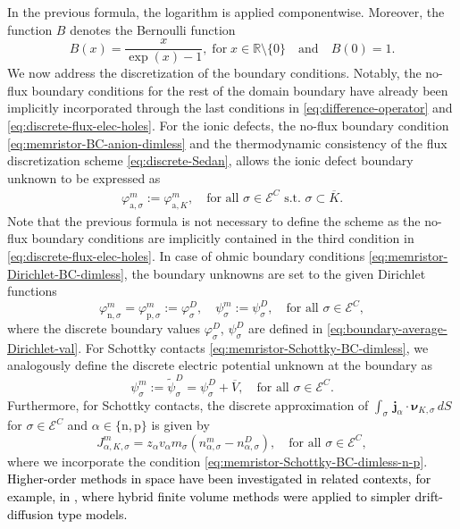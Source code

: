 \documentclass[10pt,a4paper, final]{article}
\newcommand{\reviewerTwo}[1]{\textcolor{black}{#1}}
\def\electrons{\text{n}}
\def\holes{\text{p}}
\def\ions{\text{a}}
\theoremstyle{definition}								%
\numberwithin{equation}{section}
\numberwithin{figure}{section}
\numberwithin{theorem}{section}
\begin{document}
In the previous formula, the logarithm is applied componentwise.
Moreover, the function $B$ denotes the Bernoulli function
\begin{equation} \label{eq:bernoulli}
    B(x) = \frac{x}{\exp(x) -1},\; \text{for}\; x \in \mathbb{R} \setminus \{0\} \quad \text{and} \quad B(0)=1.
\end{equation}
We now address the discretization of the boundary conditions.
Notably, the no-flux boundary conditions for the rest of the domain boundary have already been implicitly incorporated through the last conditions in \eqref{eq:difference-operator} and \eqref{eq:discrete-flux-elec-holes}.
For the ionic defects, the no-flux boundary condition \eqref{eq:memristor-BC-anion-dimless} and the thermodynamic consistency of the flux discretization scheme \eqref{eq:discrete-Sedan}, allows the ionic defect boundary unknown to be expressed as
\begin{align} \label{eq:boundary-unknown-ion}
\varphi_{\ions, \sigma}^{m} := \varphi_{\ions, K}^{m}, \quad \text{for all } \sigma \in \mathcal{E}^C {\text{ s.t. }\sigma\subset \overline{K}}.
\end{align}
Note that the previous formula is not necessary to define the scheme as the no-flux boundary conditions are implicitly contained in the third condition in \eqref{eq:discrete-flux-elec-holes}.
In case of ohmic boundary conditions \eqref{eq:memristor-Dirichlet-BC-dimless}, the boundary unknowns are set to the given Dirichlet functions
\begin{equation} \label{eq:boundary-ohmic}
       \varphi_{\electrons, \sigma}^{m} = \varphi_{\holes, \sigma}^{m}  := \varphi_{\sigma}^{D}, \quad \psi_\sigma^{m} := \psi_\sigma^D, \quad \text{for all } \sigma \in \mathcal{E}^C,
\end{equation}
where the discrete boundary values $\varphi_{\sigma}^{D}$, $\psi_\sigma^D$ are defined in \eqref{eq:boundary-average-Dirichlet-val}.
For Schottky contacts \eqref{eq:memristor-Schottky-BC-dimless}, we analogously define the discrete electric potential unknown at the boundary as
\begin{equation} \label{eq:Schottky-psi-sigma}
\psi_\sigma^{m} := \tilde{\psi}_\sigma^D = \psi_\sigma^D + \overline{V} , \quad \text{for all } \sigma \in \mathcal{E}^C.
\end{equation}
Furthermore, for Schottky contacts, the discrete approximation of $ \int_\sigma \, \mathbf{j}_\alpha \cdot \boldsymbol{\nu}_{K, \sigma} \,d S$ for $\sigma \in \mathcal{E}^C$ and $\alpha \in \{ \electrons, \holes \}$ is given by
\begin{equation} \label{eq:discrete-flux-boundary}
J_{\alpha,K, \sigma}^m =  z_\alpha v_\alpha m_\sigma (n_{\alpha, \sigma}^m - n_{\alpha, \sigma}^D), \quad \text{for all } \sigma \in \mathcal{E}^C,
\end{equation}
where we incorporate the condition \eqref{eq:memristor-Schottky-BC-dimless-n-p}.
\reviewerTwo{
    Higher-order methods in space have been investigated in related contexts, for example, in \cite{Moatti2024, Moatti2023structure}, where hybrid finite volume methods were applied to simpler drift-diffusion type models.
}
\end{document}
